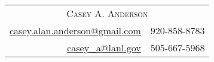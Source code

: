 
\begin{center}
	\begin{minipage}{\textwidth}
	\begin{tabular}{r|l}
		\multicolumn{2}{c}{\Huge \textsc{Casey A. Anderson}} \\
		\href{mailto:casey.alan.anderson@gmail.com}{casey.alan.anderson@gmail.com}& 920-858-8783 \\
		\href{mailto:casey\_a@lanl.gov}{casey\_a@lanl.gov} & 505-667-5968 \\
	\end{tabular}
	\end{minipage}
\end{center}


